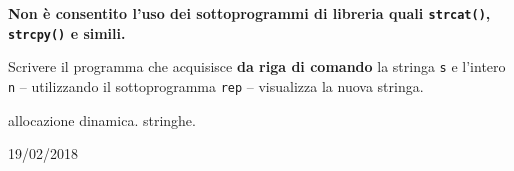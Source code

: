 \textbf{Non \`e consentito l'uso dei sottoprogrammi di libreria quali \texttt{strcat()}, \texttt{strcpy()} e simili.}

Scrivere il programma che acquisisce \textbf{da riga di comando} la stringa \texttt{s} e l'intero \texttt{n} -- utilizzando il sottoprogramma \texttt{rep} -- visualizza la nuova stringa.

\begin{tags}
allocazione dinamica. stringhe.
\end{tags}

\begin{esame}
19/02/2018 
\end{esame}



 
